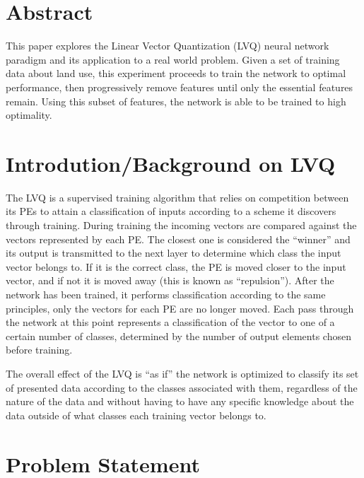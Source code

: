 \documentclass[12pt]{article}
\begin{document}
\maketitle

\section{Abstract}

This paper explores the Linear Vector Quantization (LVQ) neural network paradigm and its application to a real world problem.  Given a set of training data about land use, this experiment proceeds to train the network to optimal performance, then progressively remove features until only the essential features remain.  Using this subset of features, the network is able to be trained to high optimality.  

\section{Introdution/Background on LVQ}

The LVQ is a supervised training algorithm that relies on competition between its PEs to attain a classification of inputs according to a scheme it discovers through training.  During training the incoming vectors are compared against the vectors represented by each PE.  The closest one is considered the ``winner'' and its output is transmitted to the next layer to determine which class the input vector belongs to.  If it is the correct class, the PE is moved closer to the input vector, and if not it is moved away (this is known as ``repulsion'').  After the network has been trained, it performs classification according to the same principles, only the vectors for each PE are no longer moved.  Each pass through the network at this point represents a classification of the vector to one of a certain number of classes, determined by the number of output elements chosen before training.  

The overall effect of the LVQ is ``as if'' the network is optimized to classify its set of presented data according to the classes associated with them, regardless of the nature of the data and without having to have any specific knowledge about the data outside of what classes each training vector belongs to. 

\section{Problem Statement}
\end{document}
